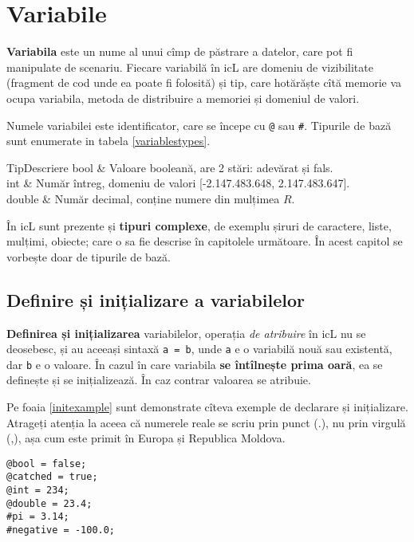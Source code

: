 \section{Variabile}

\textbf{Variabila} este un nume al unui cîmp de păstrare a datelor, care pot fi manipulate de scenariu. Fiecare variabilă în icL are domeniu de vizibilitate (fragment de cod unde ea poate fi folosită) și tip, care hotărăște cîtă memorie va ocupa variabila, metoda de distribuire a memoriei și domeniul de valori.

Numele variabilei este identificator, care se începe cu \lstinline|@| sau {\color{blue2}\lstinline|#|}. Tipurile de bază sunt enumerate in tabela \ref{variablestypes}.

%
{Tip}{Descriere}%
{
	bool   & Valoare booleană, are 2 stări: adevărat și fals. 				  \\ \hline
	int    & Număr întreg, domeniu de valori [-2.147.483.648, 2.147.483.647]. \\ \hline
	double & Număr decimal, conține numere din mulțimea $R$. 				  \\
}

În icL sunt prezente și \textbf{tipuri complexe}, de exemplu șiruri de caractere, liste, mulțimi, obiecte; care o sa fie descrise în capitolele următoare. În acest capitol se vorbește doar de tipurile de bază.

\subsection{Definire și inițializare a variabilelor}

\textbf{Definirea și inițializarea} variabilelor, operația \textit{de atribuire} în icL nu se deosebesc, și au aceeași sintaxă \lstinline|a = b|, unde \lstinline|a| e o variabilă nouă sau existentă, dar \lstinline|b| e o valoare. În cazul în care variabila \textbf{se întîlnește prima oară}, ea se definește și se inițializează. În caz contrar valoarea se atribuie.

Pe foaia \ref{initexample} sunt demonstrate cîteva exemple de declarare și inițializare. Atrageți atenția la aceea că numerele reale se scriu prin punct (.), nu prin virgulă (,), așa cum este primit în Europa și Republica Moldova.

\begin{lstlisting}[caption=Exemplu de declarare și inițializare al variabilelor,label=initexample]
@bool = false;
@catched = true;
@int = 234;
@double = 23.4;
#pi = 3.14;
#negative = -100.0;
\end{lstlisting}

